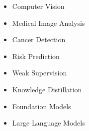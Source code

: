 
\small
\noindent
\begin{minipage}{0.25\textwidth}
    \begin{itemize}
        \item Computer Vision
        \item Medical Image Analysis
    \end{itemize}
\end{minipage}
\begin{minipage}{0.25\textwidth}
    \begin{itemize}
        \item Cancer Detection
        \item Risk Prediction
    \end{itemize}
\end{minipage}
\begin{minipage}{0.25\textwidth}
    \begin{itemize}
        \item Weak Supervision
        \item Knowledge Distillation
    \end{itemize}
\end{minipage}
\begin{minipage}{0.25\textwidth}
    \begin{itemize}
        \item Foundation Models
        \item Large Language Models
    \end{itemize}
\end{minipage}

\vspace{2mm}
